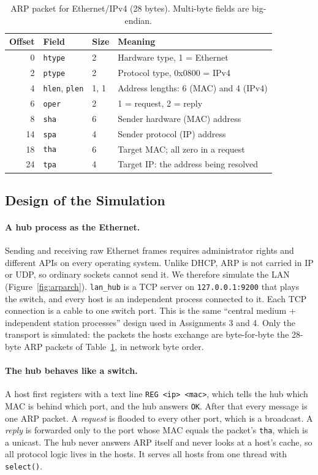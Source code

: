 \documentclass[11pt]{article}
\begin{document}
\begin{table}[H]
\centering
\small
\begin{tabular}{rllp{7.4cm}}
\toprule
\textbf{Offset} & \textbf{Field} & \textbf{Size} & \textbf{Meaning} \\
\midrule
0  & \texttt{htype} & 2 & Hardware type, 1 = Ethernet \\
2  & \texttt{ptype} & 2 & Protocol type, 0x0800 = IPv4 \\
4  & \texttt{hlen}, \texttt{plen} & 1, 1 & Address lengths: 6 (MAC) and 4 (IPv4) \\
6  & \texttt{oper} & 2 & 1 = request, 2 = reply \\
8  & \texttt{sha} & 6 & Sender hardware (MAC) address \\
14 & \texttt{spa} & 4 & Sender protocol (IP) address \\
18 & \texttt{tha} & 6 & Target MAC; all zero in a request \\
24 & \texttt{tpa} & 4 & Target IP: the address being resolved \\
\bottomrule
\end{tabular}
\caption{ARP packet for Ethernet/IPv4 (28 bytes). Multi-byte fields are big-endian.}
\label{tab:arppkt}
\end{table}


\subsection{Design of the Simulation}
\paragraph{A hub process as the Ethernet.} Sending and receiving raw Ethernet frames
requires administrator rights and different APIs on every operating system. Unlike DHCP,
ARP is not carried in IP or UDP, so ordinary sockets cannot send it. We therefore
simulate the LAN (Figure~\ref{fig:arparch}). \texttt{lan\_hub} is a TCP server on
\texttt{127.0.0.1:9200} that plays the switch, and every host is an independent process
connected to it. Each TCP connection is a cable to one switch port. This is the same
``central medium + independent station processes'' design used in Assignments 3 and 4.
Only the transport is simulated: the packets the hosts exchange are byte-for-byte the
28-byte ARP packets of Table~\ref{tab:arppkt}, in network byte order.

\paragraph{The hub behaves like a switch.} A host first registers with a text line
\texttt{REG <ip> <mac>}, which tells the hub which MAC is behind which port, and the hub
answers \texttt{OK}. After that every message is one ARP packet. A \emph{request} is
flooded to every other port, which is a broadcast. A \emph{reply} is forwarded only to the
port whose MAC equals the packet's \texttt{tha}, which is a unicast. The hub never answers
ARP itself and never looks at a host's cache, so all protocol logic lives in the hosts.
It serves all hosts from one thread with \texttt{select()}.
\end{document}
